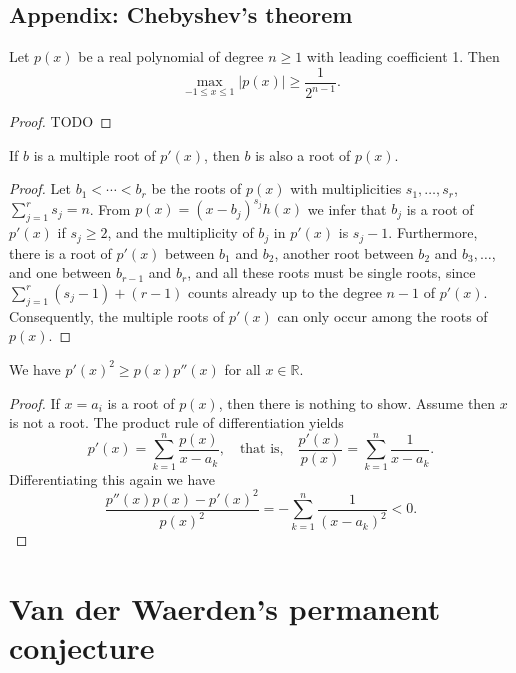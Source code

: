 \section{Appendix: Chebyshev's theorem}
\begin{theorem}
  \label{chebyshev}
  Let $p(x)$ be a real polynomial of degree $n \geq 1$ with leading coefficient 1. Then
\[
\max_{-1 \leq x \leq 1} |p(x)| \geq \frac{1}{2^{n-1}}.
\]
\end{theorem}
\begin{proof}
  TODO
\end{proof}

\begin{theorem}[Fact 1]
  \label{ch23fact1}
  If $b$ is a multiple root of $p'(x)$, then $b$ is also a root of $p(x)$.
\end{theorem}
\begin{proof}
  Let $b_1 < \cdots < b_r$ be the roots of $p(x)$ with multiplicities $s_1, \ldots, s_r$, $\sum_{j=1}^{r} s_j = n$.
  From $p(x) = (x - b_j)^{s_j} h(x)$ we infer that $b_j$ is a root of $p'(x)$ if $s_j \geq 2$,
  and the multiplicity of $b_j$ in $p'(x)$ is $s_j - 1$. Furthermore,
  there is a root of $p'(x)$ between $b_1$ and $b_2$, another root between $b_2$ and $b_3, \ldots$,
  and one between $b_{r-1}$ and $b_r$, and all these roots must be single roots,
  since $\sum_{j=1}^{r} (s_j - 1) + (r - 1)$ counts already up to the degree $n - 1$ of $p'(x)$.
  Consequently, the multiple roots of $p'(x)$ can only occur among the roots of $p(x)$.
\end{proof}

\begin{theorem}[Fact 2]
  \label{ch23fact2}
  We have $p'(x)^2 \geq p(x)p''(x)$ for all $x \in \mathbb{R}$.
\end{theorem}
\begin{proof}
  If $x = a_i$ is a root of $p(x)$, then there is nothing to show. Assume then $x$ is not a root. The product rule of differentiation yields
  \[
  p'(x) = \sum_{k=1}^{n} \frac{p(x)}{x - a_k}, \quad \text{that is,} \quad \frac{p'(x)}{p(x)} = \sum_{k=1}^{n} \frac{1}{x - a_k}.
  \]
  Differentiating this again we have
  \[
  \frac{p''(x)p(x) - p'(x)^2}{p(x)^2} = - \sum_{k=1}^{n} \frac{1}{(x - a_k)^2} < 0.
  \]
\end{proof}


\chapter{Van der Waerden's permanent conjecture}

